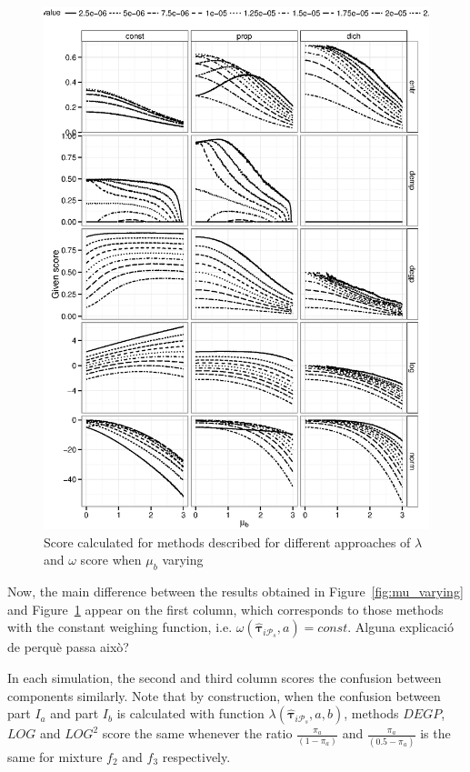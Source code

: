 \documentclass[10pt, a4paper]{article}
\newcommand{\m}[1]{\boldsymbol{#1}}
\begin{document}
\begin{spacing}{1.9}
\begin{figure}[!t]
\centering
\includegraphics[scale=.5]{fig01ball.eps}
\caption{Score calculated for methods described for different approaches of $\lambda$ and $\omega$ score when $\mu_b$ varying}
\label{fig:mu_varying3}
\end{figure}


Now, the main difference between the results obtained in Figure~\ref{fig:mu_varying} and Figure~\ref{fig:mu_varying3} appear on the first column, which corresponds to those methods with the constant weighing function, i.e. $\omega(\hat{\m \tau}_{i \mathcal{P}_s}, a) = const$. {\color{blue} Alguna explicaci\'{o} de perqu\`{e} passa aix\`{o}?}

In each simulation, the second and third column scores the confusion between components similarly. Note that by construction, when the confusion between part $I_a$ and part $I_b$ is calculated with function $\lambda(\hat{\m \tau}_{i \mathcal{P}_s}, a, b)$, methods $DEGP$, $LOG$ and $LOG^2$ score the same whenever the ratio $\frac{\pi_a}{(1 - \pi_a)}$ and $\frac{\pi_a}{(0.5 - \pi_a)}$ is the same for mixture $f_2$ and $f_3$ respectively.



\end{spacing}
\end{document}
